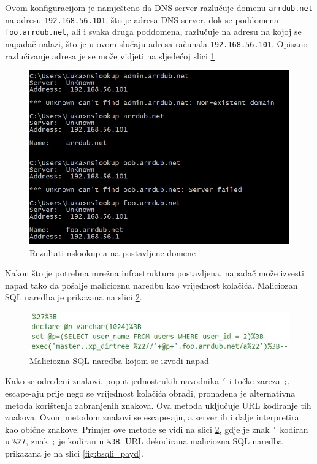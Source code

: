 \documentclass[12pt, oneside, onecolumn]{book}
\begin{document}
{Ovom konfiguracijom je namješteno da DNS server razlučuje domenu \texttt{arrdub.net} na adresu \texttt{192.168.56.101}, što je adresa DNS server, dok se poddomena \texttt{foo.arrdub.net}, ali i svaka druga poddomena, razlučuje na adresu na kojoj se napadač nalazi, što je u ovom slučaju adresa računala \texttt{192.168.56.101}. Opisano razlučivanje adresa je se može vidjeti na sljedećoj slici \ref{fig:bsqli_nsl}.

\begin{figure}[H]
	\begin{center}
		\includegraphics[width=\textwidth]{bsqli_nsl.jpg}
		\caption{Rezultati nslookup-a na postavljene domene} \label{fig:bsqli_nsl}
	\end{center}
\end{figure}

Nakon što je potrebna mrežna infrastruktura postavljena, napadač može izvesti napad tako da pošalje malicioznu naredbu kao vrijednost kolačića. Maliciozan SQL naredba je prikazana na slici \ref{fig:bsqli_pay}.

\begin{figure}[H]
	\begin{center}
		\includegraphics[width=\textwidth]{bsqli_pay.jpg}
		\caption{Maliciozna SQL naredba kojom se izvodi napad} \label{fig:bsqli_pay}
	\end{center}
\end{figure}

Kako se određeni znakovi, poput jednostrukih navodnika \texttt{'} i točke zareza \texttt{;}, escape-aju prije nego se vrijednost kolačića obradi, pronađena je alternativna metoda korištenja zabranjenih znakova. Ova metoda uključuje URL kodiranje tih znakova. Ovom metodom znakovi se escape-aju, a server ih i dalje interpretira kao obične znakove. Primjer ove metode se vidi na slici \ref{fig:bsqli_pay}, gdje je znak \texttt{'} kodiran u \texttt{\%27}, znak \texttt{;} je kodiran u \texttt{\%3B}. URL dekodirana maliciozna SQL naredba prikazana je na slici \ref{fig:bsqli_payd}.

}
\end{document}

